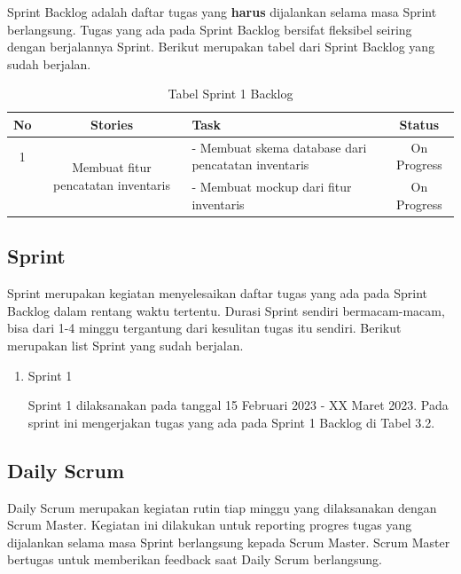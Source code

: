 Sprint Backlog adalah daftar tugas yang \textbf{harus} dijalankan selama masa Sprint berlangsung. Tugas yang ada pada Sprint Backlog bersifat fleksibel seiring dengan berjalannya Sprint. Berikut merupakan tabel dari Sprint Backlog yang sudah berjalan.

\begin{table}[H]	
	\begin{center}
		\caption{Tabel Sprint 1 Backlog}
		\label{tab:table6}
		\begin{tabular}{|c|c|m{13em}|c|}
		\hline
		\textbf{No} & \textbf{Stories} & \textbf{Task} & \textbf{Status} \\
		\hline
		1 & \multirow{2}{10em}{Membuat fitur pencatatan inventaris} & - Membuat skema database dari pencatatan inventaris & On Progress \\
		&  & - Membuat mockup dari fitur inventaris & On Progress \\ 
		\hline
		\end{tabular}
	\end{center}
\end{table}

\subsection{Sprint}

Sprint merupakan kegiatan menyelesaikan daftar tugas yang ada pada Sprint Backlog dalam rentang waktu tertentu. Durasi Sprint sendiri bermacam-macam, bisa dari 1-4 minggu tergantung dari kesulitan tugas itu sendiri. Berikut merupakan list Sprint yang sudah berjalan.

\begin{enumerate}
	\item Sprint 1
	
	Sprint 1 dilaksanakan pada tanggal 15 Februari 2023 - XX Maret 2023. Pada sprint ini mengerjakan tugas yang ada pada Sprint 1 Backlog di Tabel 3.2.
\end{enumerate}

\subsection{Daily Scrum}

Daily Scrum merupakan kegiatan rutin tiap minggu yang dilaksanakan dengan Scrum Master. Kegiatan ini dilakukan untuk reporting progres tugas yang dijalankan selama masa Sprint berlangsung kepada Scrum Master. Scrum Master bertugas untuk memberikan feedback saat Daily Scrum berlangsung.

